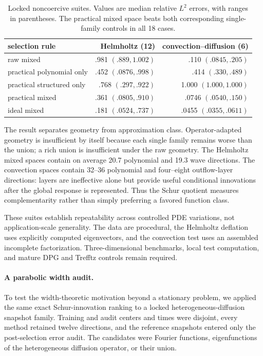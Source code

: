 \documentclass[11pt]{article}
\numberwithin{algorithm}{section}
\theoremstyle{definition}\newtheorem{definition}[theorem]{Definition}
\theoremstyle{remark}\newtheorem{remark}[theorem]{Remark}
\begin{document}
\begin{table}[t]
\centering
\caption{Locked noncoercive suites. Values are median relative $L^2$ errors,
with ranges in parentheses. The practical mixed space beats both corresponding
single-family controls in all 18 cases.}
\begin{tabular}{lrr}
\toprule
selection rule & Helmholtz (12) & convection--diffusion (6)\\
\midrule
raw mixed & .981 $(.889,1.002)$ & .110 $(.0845,.205)$\\
practical polynomial only & .452 $(.0876,.998)$ & .414 $(.330,.489)$\\
practical structured only & .768 $(.297,.922)$ & 1.000 $(1.000,1.000)$\\
practical mixed & .361 $(.0805,.910)$ & .0746 $(.0540,.150)$\\
ideal mixed & .181 $(.0524,.737)$ & .0455 $(.0355,.0611)$\\
\bottomrule
\end{tabular}
\label{tab:locked-noncoercive-suites}
\end{table}

The result separates geometry from approximation class. Operator-adapted
geometry is insufficient by itself because each single family remains worse
than the union; a rich union is insufficient under the raw geometry. The
Helmholtz mixed spaces contain on average 20.7 polynomial and 19.3 wave
directions. The convection spaces contain 32--36 polynomial and four--eight
outflow-layer directions: layers are ineffective alone but provide useful
conditional innovations after the global response is represented. Thus the
Schur quotient measures complementarity rather than simply preferring a
favored function class.

These suites establish repeatability across controlled PDE variations, not
application-scale generality. The data are procedural, the Helmholtz deflation
uses explicitly computed eigenvectors, and the convection test uses an
assembled incomplete factorization. Three-dimensional benchmarks, local test
computation, and mature DPG and Trefftz controls remain required.

\paragraph{A parabolic width audit.}
To test the width-theoretic motivation beyond a stationary problem, we applied
the same exact Schur-innovation ranking to a locked heterogeneous-diffusion
snapshot family.  Training and audit centers and times were disjoint, every
method retained twelve directions, and the reference snapshots entered only
the post-selection error audit.  The candidates were Fourier functions,
eigenfunctions of the heterogeneous diffusion operator, or their union.
\end{document}
